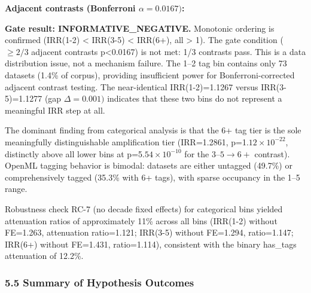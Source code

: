 \textbf{Adjacent contrasts (Bonferroni $\alpha =0.0167)$:}

\begin{table}[htbp]
\centering
{}
\end{table}

\textbf{Gate result: INFORMATIVE\_NEGATIVE.} Monotonic ordering is confirmed (IRR(1-2) < IRR(3-5) < IRR(6+), all > 1). The gate condition ($\geq 2/3$ adjacent contrasts p<0.0167) is not met: 1/3 contrasts pass. This is a data distribution issue, not a mechanism failure. The 1--2 tag bin contains only 73 datasets (1.4\% of corpus), providing insufficient power for Bonferroni-corrected adjacent contrast testing. The near-identical IRR(1-2)=1.1267 versus IRR(3-5)=1.1277 (gap $\Delta =0.001)$ indicates that these two bins do not represent a meaningful IRR step at all.

The dominant finding from categorical analysis is that the 6+ tag tier is the sole meaningfully distinguishable amplification tier (IRR=1.2861, p=1.$12\times 10^{-22}$, distinctly above all lower bins at p=5.$54\times 10^{-10}$ for the 3--$5\rightarrow 6+$ contrast). OpenML tagging behavior is bimodal: datasets are either untagged (49.7\%) or comprehensively tagged (35.3\% with 6+ tags), with sparse occupancy in the 1--5 range.

Robustness check RC-7 (no decade fixed effects) for categorical bins yielded attenuation ratios of approximately 11\% across all bins (IRR(1-2) without FE=1.263, attenuation ratio=1.121; IRR(3-5) without FE=1.294, ratio=1.147; IRR(6+) without FE=1.431, ratio=1.114), consistent with the binary has\_tags attenuation of 12.2\%.

\subsubsection{5.5 Summary of Hypothesis Outcomes}

